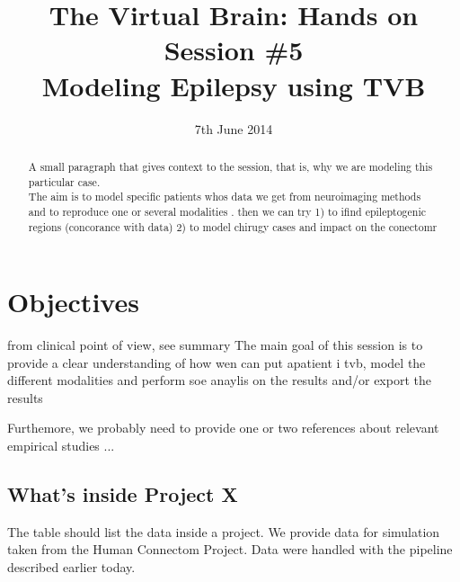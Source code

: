 \documentclass{tufte-handout}
\title{The Virtual Brain: Hands on Session \#5 \\
Modeling Epilepsy using TVB}
\date{7th June 2014}
\begin{document}
\maketitle %

\begin{abstract}
\noindent A small paragraph that gives context to the session, that is, 
why we are modeling this particular case.\\
The aim is to model specific patients whos data we get from neuroimaging methods and to reproduce one or several modalities . then we can try 
1) to ifind epileptogenic regions (concorance with data) 
2) to model chirugy cases and impact on the conectomr
\end{abstract}


 

\section{Objectives}\label{sec:objectives}
from clinical point of view, see summary
The main goal of this session is to provide a clear understanding of how wen can put apatient i tvb, model the different modalities and perform soe anaylis on the results and/or export the results

Furthemore, we probably need to provide one or two references about relevant
empirical studies ...


\subsection{What's inside Project X }\label{sec:project_data}

The table should list the data inside a project. 
We provide data for simulation taken from the Human Connectom Project. Data were handled with the pipeline described earlier today.
\end{document}
